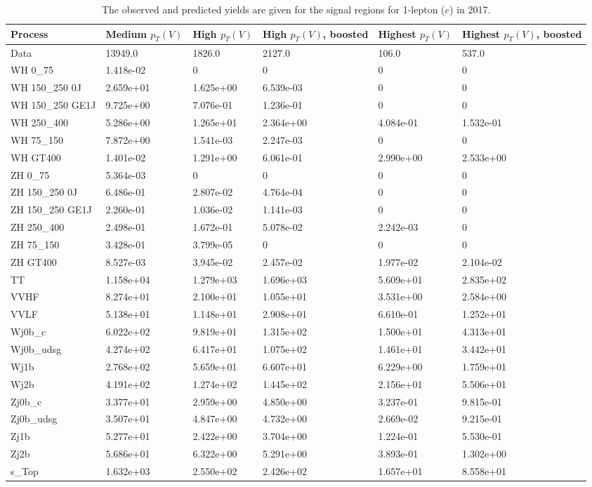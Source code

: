 \begin{table}
\centering
\caption[2017 1-lepton ($e$) signal selection yields]{
                  The observed and predicted yields are given for the
                  signal regions for 1-lepton ($e$) in 2017.
                  }
{\footnotesize
\begin{tabularx}{\textwidth}{|X|X|X|X|X|X|}
\hline
Process & Medium $p_{T}(V)$ & High $p_{T}(V)$ & High $p_{T}(V)$, boosted & Highest $p_{T}(V)$ & Highest $p_{T}(V)$, boosted \\
\hline
Data & 13949.0 & 1826.0 & 2127.0 & 106.0 & 537.0 \\
\hline
WH 0\_75 & 1.418e-02 & 0 & 0 & 0 & 0 \\
WH 150\_250 0J & 2.659e+01 & 1.625e+00 & 6.539e-03 & 0 & 0 \\
WH 150\_250 GE1J & 9.725e+00 & 7.076e-01 & 1.236e-01 & 0 & 0 \\
WH 250\_400 & 5.286e+00 & 1.265e+01 & 2.364e+00 & 4.084e-01 & 1.532e-01 \\
WH 75\_150 & 7.872e+00 & 1.541e-03 & 2.247e-03 & 0 & 0 \\
WH GT400 & 1.401e-02 & 1.291e+00 & 6.061e-01 & 2.990e+00 & 2.533e+00 \\
ZH 0\_75 & 5.364e-03 & 0 & 0 & 0 & 0 \\
ZH 150\_250 0J & 6.486e-01 & 2.807e-02 & 4.764e-04 & 0 & 0 \\
ZH 150\_250 GE1J & 2.260e-01 & 1.036e-02 & 1.141e-03 & 0 & 0 \\
ZH 250\_400 & 2.498e-01 & 1.672e-01 & 5.078e-02 & 2.242e-03 & 0 \\
ZH 75\_150 & 3.428e-01 & 3.799e-05 & 0 & 0 & 0 \\
ZH GT400 & 8.527e-03 & 3.945e-02 & 2.457e-02 & 1.977e-02 & 2.104e-02 \\
\hline
TT & 1.158e+04 & 1.279e+03 & 1.696e+03 & 5.609e+01 & 2.835e+02 \\
VVHF & 8.274e+01 & 2.100e+01 & 1.055e+01 & 3.531e+00 & 2.584e+00 \\
VVLF & 5.138e+01 & 1.148e+01 & 2.908e+01 & 6.610e-01 & 1.252e+01 \\
Wj0b\_c & 6.022e+02 & 9.819e+01 & 1.315e+02 & 1.500e+01 & 4.313e+01 \\
Wj0b\_udsg & 4.274e+02 & 6.417e+01 & 1.075e+02 & 1.461e+01 & 3.442e+01 \\
Wj1b & 2.768e+02 & 5.659e+01 & 6.607e+01 & 6.229e+00 & 1.759e+01 \\
Wj2b & 4.191e+02 & 1.274e+02 & 1.445e+02 & 2.156e+01 & 5.506e+01 \\
Zj0b\_c & 3.377e+01 & 2.959e+00 & 4.850e+00 & 3.237e-01 & 9.815e-01 \\
Zj0b\_udsg & 3.507e+01 & 4.847e+00 & 4.732e+00 & 2.669e-02 & 9.215e-01 \\
Zj1b & 5.277e+01 & 2.422e+00 & 3.704e+00 & 1.224e-01 & 5.530e-01 \\
Zj2b & 5.686e+01 & 6.322e+00 & 5.291e+00 & 3.893e-01 & 1.302e+00 \\
s\_Top & 1.632e+03 & 2.550e+02 & 2.426e+02 & 1.657e+01 & 8.558e+01 \\
\hline
\end{tabularx}
}
\label{tab:sr-Wen-2017}
\end{table}

